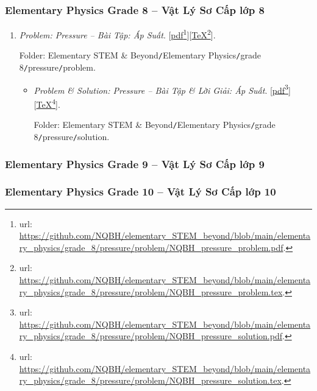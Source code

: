 \documentclass[12pt,oneside]{book}
\begin{document}
\subsubsection{Elementary Physics Grade 8 -- Vật Lý Sơ Cấp lớp 8}

\begin{enumerate}
	\item {\it Problem: Pressure -- Bài Tập: Áp Suất}. [\href{https://github.com/NQBH/elementary_STEM_beyond/blob/main/elementary_physics/grade_8/pressure/problem/NQBH_pressure_problem.pdf}{pdf}\footnote{{\sc url}: \url{https://github.com/NQBH/elementary_STEM_beyond/blob/main/elementary_physics/grade_8/pressure/problem/NQBH_pressure_problem.pdf}.}][\href{https://github.com/NQBH/elementary_STEM_beyond/blob/main/elementary_physics/grade_8/pressure/problem/NQBH_pressure_problem.tex}{\TeX}\footnote{{\sc url}: \url{https://github.com/NQBH/elementary_STEM_beyond/blob/main/elementary_physics/grade_8/pressure/problem/NQBH_pressure_problem.tex}.}].
	
	Folder: {\sf Elementary STEM \& Beyond{\tt/}Elementary Physics{\tt/}grade 8{\tt/}pressure{\tt/}problem}.
	\begin{itemize}
		\item {\it Problem \& Solution: Pressure -- Bài Tập \& Lời Giải: Áp Suất}. [\href{https://github.com/NQBH/elementary_STEM_beyond/blob/main/elementary_physics/grade_8/pressure/problem/NQBH_pressure_solution.pdf}{pdf}\footnote{{\sc url}: \url{https://github.com/NQBH/elementary_STEM_beyond/blob/main/elementary_physics/grade_8/pressure/problem/NQBH_pressure_solution.pdf}.}][\href{https://github.com/NQBH/elementary_STEM_beyond/blob/main/elementary_physics/grade_8/pressure/problem/NQBH_pressure_solution.tex}{\TeX}\footnote{{\sc url}: \url{https://github.com/NQBH/elementary_STEM_beyond/blob/main/elementary_physics/grade_8/pressure/problem/NQBH_pressure_solution.tex}.}].
		
		Folder: {\sf Elementary STEM \& Beyond{\tt/}Elementary Physics{\tt/}grade 8{\tt/}pressure{\tt/}solution}.
	\end{itemize}
\end{enumerate}

\subsubsection{Elementary Physics Grade 9 -- Vật Lý Sơ Cấp lớp 9}

\subsubsection{Elementary Physics Grade 10 -- Vật Lý Sơ Cấp lớp 10}
\end{document}
